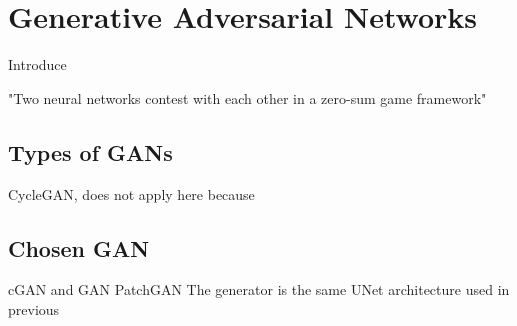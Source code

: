 \chapter{Generative Adversarial Networks}
Introduce

"Two neural networks contest with each other in a zero-sum game framework"

\section{Types of GANs} 
CycleGAN, does not apply here because

\section{Chosen GAN}
cGAN and GAN
PatchGAN
The generator is the same UNet architecture used in previous

